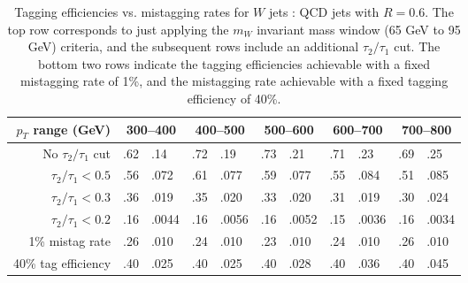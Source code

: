 \documentclass{JHEP3}
\begin{document}
\begin{table}[t]
  \begin{center}
    \begin{tabular}{ r |r@{ : }lr@{ : }lr@{ : }lr@{ : }lr@{ : }l}
     \hline
     \hline
     $p_T$ range (GeV) & \multicolumn{2}{c}{300--400} & \multicolumn{2}{c}{400--500} & \multicolumn{2}{c}{500--600} & \multicolumn{2}{c}{600--700} & \multicolumn{2}{c}{700--800} \\ 
     \hline
     No $\tau_2/\tau_1$ cut & .62 & .14 & .72 & .19 & .73 & .21 & .71 & .23 & .69 & .25 \\
     $\tau_2/\tau_1 < 0.5$ & .56 & .072 & .61 & .077 & .59 & .077 & .55 & .084 & .51 & .085 \\
     $\tau_2/\tau_1 < 0.3$ & .36 & .019 & .35 & .020 & .33 & .020 & .31 & .019 & .30 & .024 \\
     $\tau_2/\tau_1 < 0.2$ & .16 & .0044 & .16 & .0056 & .16 & .0052 & .15 & .0036 & .16 & .0034 \\
     \hline
     1\% mistag rate & .26 & .010 & .24 & .010 & .23 & .010 & .24 & .010 & .26 & .010 \\
     40\% tag efficiency & .40 & .025 & .40 & .025 & .40 & .028 & .40 & .036 & .40 & .045 \\
     \hline
     \hline
    \end{tabular}
    \caption{Tagging efficiencies vs. mistagging rates for $W$ jets : QCD jets with $R= 0.6$.  The top row corresponds to just applying the $m_W$ invariant mass window (65 GeV to 95 GeV) criteria, and the subsequent rows include an additional $\tau_2/\tau_1$ cut.  The bottom two rows indicate the tagging efficiencies achievable with  a fixed mistagging rate of 1\%, and the mistagging rate achievable with a fixed tagging efficiency of 40\%.}
      \label{tab:WSigEff06}
  \end{center}
\end{table}
\end{document}
